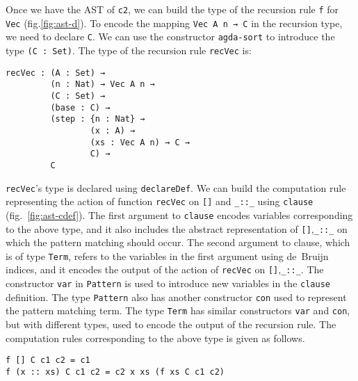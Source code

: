 \documentclass[sigplan,10pt]{acmart}
\begin{document}
Once we have the AST of {\tt c2}, we can build the type of the recursion rule {\tt f} for {\tt Vec} (fig.\ref{fig:ast-d}). To encode the mapping {\tt Vec A n → C} in the recursion type, we need to declare {\tt C}. We can use the constructor {\tt agda-sort} to introduce the type {\tt (C : Set)}. The type of the recursion rule \texttt{recVec} is:
\begin{center}
\begin{BVerbatim}
recVec : (A : Set) →
         (n : Nat) → Vec A n →
         (C : Set) →
         (base : C) →
         (step : {n : Nat} →
                 (x : A) →
                 (xs : Vec A n) → C →
                 C) →
         C
\end{BVerbatim}
\end{center}

\texttt{recVec}'s type is declared using {\tt declareDef}. We can build the computation rule representing the action of function \texttt{recVec} on {\tt []} and {\tt \_::\_} using {\tt clause} (fig.~\ref{fig:ast-cdef}). The first argument to {\tt clause} encodes variables corresponding to the above type, and it also includes the abstract representation of {\tt []},{\tt \_::\_} on which the pattern matching should occur. The second argument to clause, which is of type {\tt Term}, refers to the variables in the first argument using de~Bruijn indices, and it encodes the output of the action of \texttt{recVec} on {\tt []},{\tt \_::\_}. The constructor {\tt var} in {\tt Pattern} is used to introduce new variables in the {\tt clause} definition. The type {\tt Pattern} also has another constructor {\tt con} used to represent the pattern matching term. The type {\tt Term} has similar constructors {\tt var} and {\tt con}, but with different types, used to encode the output of the recursion rule. The computation rules corresponding to the above type is given as follows.

\begin{center}
\begin{BVerbatim}
f [] C c1 c2 = c1
f (x :: xs) C c1 c2 = c2 x xs (f xs C c1 c2)
\end{BVerbatim}
\end{center}
\end{document}
